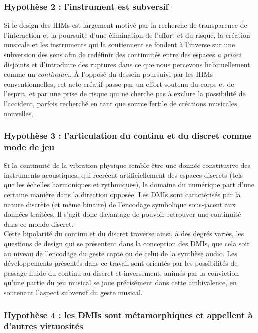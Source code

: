 \subsubsection*{Hypothèse 2 : l'instrument est subversif}

\noindent Si le design des \glspl{IHM} est largement motivé par la recherche de transparence de l'interaction et la poursuite d'une élimination de l'effort et du risque, la création musicale et les instruments qui la soutiennent se fondent à l'inverse sur une subversion des sens afin de redéfinir des continuités entre des espaces \textit{a priori} disjoints et d'introduire des ruptures dans ce que nous percevons habituellement comme un \textit{continuum}. À l'opposé du dessein poursuivi par les \glspl{IHM} conventionnelles, cet acte créatif passe par un effort soutenu du corps et de l'esprit, et par une prise de risque qui ne cherche pas à exclure la possibilité de l'accident, parfois recherché en tant que source fertile de créations musicales nouvelles.


\subsubsection*{Hypothèse 3 : l'articulation du continu et du discret comme mode de jeu}
\noindent Si la continuité de la vibration physique semble être une donnée constitutive des instruments acoustiques, qui recréent artificiellement des espaces discrets (tels que les échelles harmoniques et rythmiques), le domaine du numérique part d'une certaine manière dans la direction opposée. Les \glspl{DMI} sont caractérisés par la nature discrète (et même binaire) de l'encodage symbolique sous-jacent aux données traitées. Il s'agit donc davantage de pouvoir retrouver une continuité dans ce monde discret.\\
\indent Cette bipolarité du continu et du discret traverse ainsi, à des degrés variés, les questions de design qui se présentent dans la conception des \glspl{DMI}, que cela soit au niveau de l'encodage du geste capté ou de celui de la synthèse audio. Les développements présentés dans ce travail sont orientés par les possibilités de passage fluide du continu au discret et inversement, animés par la conviction qu'une partie du jeu musical se joue précisément dans cette ambivalence, en soutenant l'aspect subversif du geste musical.

\subsubsection*{Hypothèse 4 : les DMIs sont métamorphiques et appellent à d'autres virtuosités}

